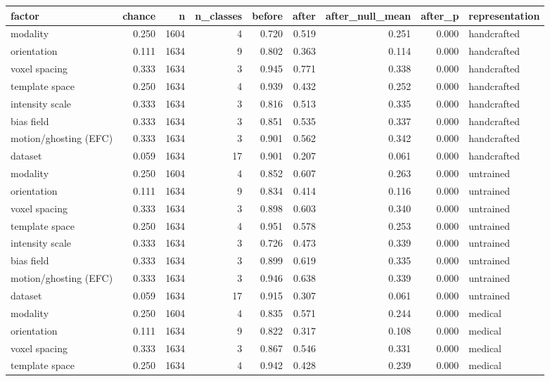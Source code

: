 \begin{tabular}{lrrrrrrrl}
\toprule
factor & chance & n & n\_classes & before & after & after\_null\_mean & after\_p & representation \\
\midrule
modality & 0.250 & 1604 & 4 & 0.720 & 0.519 & 0.251 & 0.000 & handcrafted \\
orientation & 0.111 & 1634 & 9 & 0.802 & 0.363 & 0.114 & 0.000 & handcrafted \\
voxel spacing & 0.333 & 1634 & 3 & 0.945 & 0.771 & 0.338 & 0.000 & handcrafted \\
template space & 0.250 & 1634 & 4 & 0.939 & 0.432 & 0.252 & 0.000 & handcrafted \\
intensity scale & 0.333 & 1634 & 3 & 0.816 & 0.513 & 0.335 & 0.000 & handcrafted \\
bias field & 0.333 & 1634 & 3 & 0.851 & 0.535 & 0.337 & 0.000 & handcrafted \\
motion/ghosting (EFC) & 0.333 & 1634 & 3 & 0.901 & 0.562 & 0.342 & 0.000 & handcrafted \\
dataset & 0.059 & 1634 & 17 & 0.901 & 0.207 & 0.061 & 0.000 & handcrafted \\
modality & 0.250 & 1604 & 4 & 0.852 & 0.607 & 0.263 & 0.000 & untrained \\
orientation & 0.111 & 1634 & 9 & 0.834 & 0.414 & 0.116 & 0.000 & untrained \\
voxel spacing & 0.333 & 1634 & 3 & 0.898 & 0.603 & 0.340 & 0.000 & untrained \\
template space & 0.250 & 1634 & 4 & 0.951 & 0.578 & 0.253 & 0.000 & untrained \\
intensity scale & 0.333 & 1634 & 3 & 0.726 & 0.473 & 0.339 & 0.000 & untrained \\
bias field & 0.333 & 1634 & 3 & 0.899 & 0.619 & 0.335 & 0.000 & untrained \\
motion/ghosting (EFC) & 0.333 & 1634 & 3 & 0.946 & 0.638 & 0.339 & 0.000 & untrained \\
dataset & 0.059 & 1634 & 17 & 0.915 & 0.307 & 0.061 & 0.000 & untrained \\
modality & 0.250 & 1604 & 4 & 0.835 & 0.571 & 0.244 & 0.000 & medical \\
orientation & 0.111 & 1634 & 9 & 0.822 & 0.317 & 0.108 & 0.000 & medical \\
voxel spacing & 0.333 & 1634 & 3 & 0.867 & 0.546 & 0.331 & 0.000 & medical \\
template space & 0.250 & 1634 & 4 & 0.942 & 0.428 & 0.239 & 0.000 & medical \\

\end{tabular}

